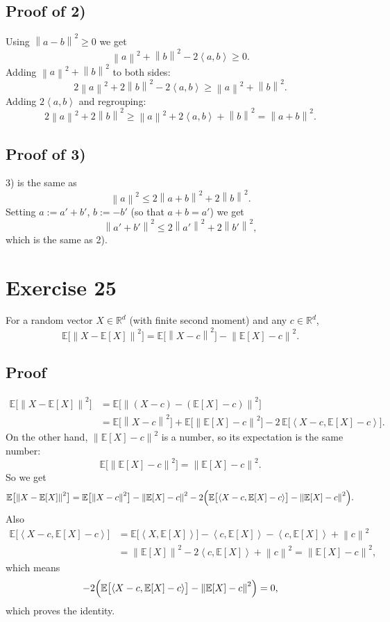 \documentclass[11pt,a4paper]{article}
\newcommand{\R}{\mathbb{R}}
\newcommand{\E}{\mathbb{E}}
\newcommand{\norm}[1]{\left\| #1 \right\|}
\newcommand{\ip}[2]{\left\langle #1, #2 \right\rangle}
\begin{document}
\subsection*{Proof of 2)}
Using $\norm{a-b}^2 \ge 0$ we get
\[
  \norm{a}^2 + \norm{b}^2 - 2\ip{a}{b} \ge 0 .
\]
Adding $\norm{a}^2 + \norm{b}^2$ to both sides:
\[
  2\norm{a}^2 + 2\norm{b}^2 - 2\ip{a}{b} \ge \norm{a}^2 + \norm{b}^2 .
\]
Adding $2\ip{a}{b}$ and regrouping:
\[
  2\norm{a}^2 + 2\norm{b}^2 \ge \norm{a}^2 + 2\ip{a}{b} + \norm{b}^2 = \norm{a+b}^2 .
\]

\subsection*{Proof of 3)}
3) is the same as
\[
  \norm{a}^2 \le 2\norm{a+b}^2 + 2\norm{b}^2 .
\]
Setting $a := a' + b'$, $b := -b'$ (so that $a + b = a'$) we get
\[
  \norm{a'+b'}^2 \le 2\norm{a'}^2 + 2\norm{b'}^2,
\]
which is the same as 2).

\section*{Exercise 25}

For a random vector $X \in \R^d$ (with finite second moment) and any $c \in \R^d$,
\[
  \E\bigl[\norm{X - \E[X]}^2\bigr] = \E\bigl[\norm{X - c}^2\bigr] - \norm{\E[X] - c}^2 .
\]

\subsection*{Proof}
\begin{align*}
  \E\bigl[\norm{X - \E[X]}^2\bigr]
  &= \E\bigl[\norm{(X - c) - (\E[X] - c)}^2\bigr] \\
  &= \E\bigl[\norm{X - c}^2\bigr] + \E\bigl[\norm{\E[X] - c}^2\bigr]
     - 2\,\E\bigl[\ip{X-c}{\E[X]-c}\bigr].
\end{align*}
On the other hand, $\norm{\E[X] - c}^2$ is a number, so its expectation is the same number:
\[
  \E\bigl[\norm{\E[X] - c}^2\bigr] = \norm{\E[X] - c}^2 .
\]
So we get
\[
  \E\bigl[\norm{X - \E[X]}^2\bigr]
  = \E\bigl[\norm{X - c}^2\bigr] - \norm{\E[X] - c}^2
    - 2\Bigl(\E\bigl[\ip{X-c}{\E[X]-c}\bigr] - \norm{\E[X] - c}^2\Bigr).
\]
Also
\begin{align*}
  \E\bigl[\ip{X-c}{\E[X]-c}\bigr]
  &= \E\bigl[\ip{X}{\E[X]}\bigr] - \ip{c}{\E[X]} - \ip{c}{\E[X]} + \norm{c}^2 \\
  &= \norm{\E[X]}^2 - 2\ip{c}{\E[X]} + \norm{c}^2 = \norm{\E[X] - c}^2,
\end{align*}
which means
\[
  -2\Bigl(\E\bigl[\ip{X-c}{\E[X]-c}\bigr] - \norm{\E[X] - c}^2\Bigr) = 0,
\]
which proves the identity.
\end{document}
